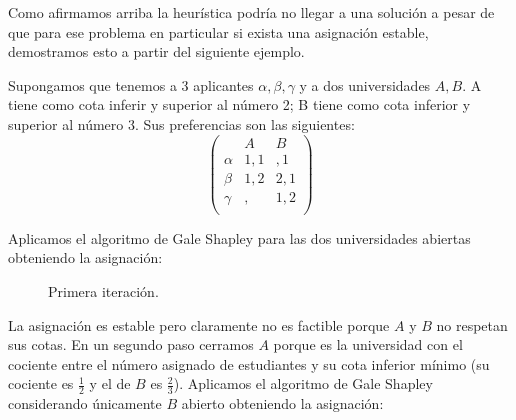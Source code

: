 Como afirmamos arriba la heurística podría no llegar a una solución a pesar de que para ese problema en particular si exista una asignación estable, demostramos esto a partir del siguiente ejemplo. 

\begin{eje} \cite{Todo}
Supongamos que tenemos a 3 aplicantes $\alpha,\beta,\gamma$ y a dos universidades $A,B$. A tiene como cota inferir y superior al número 2; B tiene como cota inferior y superior al número 3. Sus preferencias son las siguientes:
$$\begin{pmatrix}
& A & B \\
\alpha & 1,1 & ,1 \\
\beta & 1,2 & 2,1 \\ 
\gamma & , & 1,2 \\ 
\end{pmatrix}$$

Aplicamos el algoritmo de Gale Shapley para las dos universidades abiertas obteniendo la asignación:
\begin{figure}[H]\centering


\caption{Primera iteración.}
\end{figure}

La asignación es estable pero claramente no es factible porque $A$ y $B$ no respetan sus cotas. En un segundo paso cerramos $A$ porque es la universidad con el cociente entre el número asignado de estudiantes y su cota inferior mínimo (su cociente es $\frac{1}{2}$ y el de $B$ es $\frac{2}{3}$). Aplicamos el algoritmo de Gale Shapley considerando únicamente $B$ abierto obteniendo la asignación:


\end{eje}
